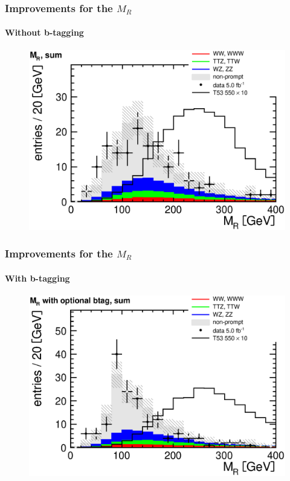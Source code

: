 \documentclass[ukenglish]{beamer}
\begin{document}
\begin{frame}
    \frametitle{Improvements for the $M_R$}
    \framesubtitle{Without b-tagging}
        \begin{figure}[h!]
            \centering
                \includegraphics[height=.8\textheight]{mr_sum.eps}
        \end{figure}
\end{frame}

\begin{frame}
    \frametitle{Improvements for the $M_R$}
    \framesubtitle{With b-tagging}
        \begin{figure}[h!]
            \centering
                    \includegraphics[height=.8\textheight]{mr_optional_btag_sum.eps}
        \end{figure}
\end{frame}
\end{document}
